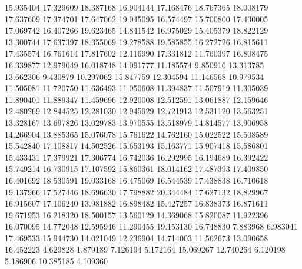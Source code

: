 15.935404
17.329609
18.387168
16.904144
17.168476
18.767365
18.008179
17.637609
17.374701
17.647062
19.045095
16.574497
15.700800
17.430005
17.069742
16.407266
19.623465
14.841542
16.975029
15.405379
18.822129
13.300744
17.637397
18.355069
19.278588
19.585855
16.272726
16.815611
17.435574
16.761614
17.817602
12.116990
17.331812
11.760397
16.808475
16.339877
12.979049
16.018748
14.091777
11.185574
9.850916
13.313785
13.662306
9.430879
10.297062
15.847759
12.304594
11.146568
10.979534
11.505081
11.720750
11.636493
11.050608
11.394837
11.507919
11.305039
11.890401
11.889347
11.459696
12.920008
12.512591
13.061887
12.159646
12.480269
12.844525
12.281030
12.945929
12.721913
12.531120
13.563251
13.328167
13.697826
13.029783
13.970555
13.518979
14.814577
13.906958
14.266904
13.885365
15.076078
15.761622
14.762160
15.022522
15.508589
15.542840
17.108817
14.502526
15.653193
15.163771
15.907418
15.586801
15.433431
17.379921
17.306774
16.742036
16.292995
16.194689
16.392422
15.749214
16.730915
17.107592
15.860361
18.014162
17.487393
17.409850
16.401692
18.530591
19.033168
16.475069
16.544539
17.438838
16.710618
19.137966
17.527446
18.696630
17.798882
20.344484
17.627132
18.829967
16.915607
17.106240
13.981882
16.898482
15.427257
16.838373
16.871611
19.671953
16.218320
18.500157
13.560129
14.369068
15.820087
11.922396
16.070095
14.772048
12.595946
11.290455
19.153130
16.748830
7.883968
6.983041
17.469533
15.944730
14.021049
12.236904
14.714003
11.562673
13.090658
16.452223
4.629828
1.879189
7.126194
5.172164
15.069267
12.740264
6.120198
5.186906
10.385185
4.109360
